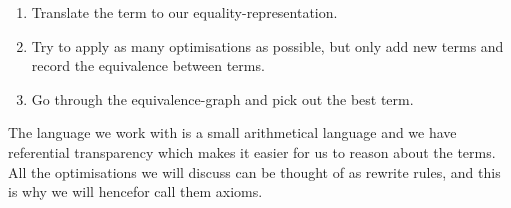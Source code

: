 \begin{enumerate}
  \item Translate the term to our equality-representation.
  \item Try to apply as many optimisations as possible, but only add new terms and
        record the equivalence between terms.
  \item Go through the equivalence-graph and pick out the best term.
\end{enumerate}

The language we work with is a small arithmetical language and we have referential
transparency which makes it easier for us to reason about the terms. All the optimisations
we will discuss can be thought of as rewrite rules, and this is why we will hencefor
call them axioms.


